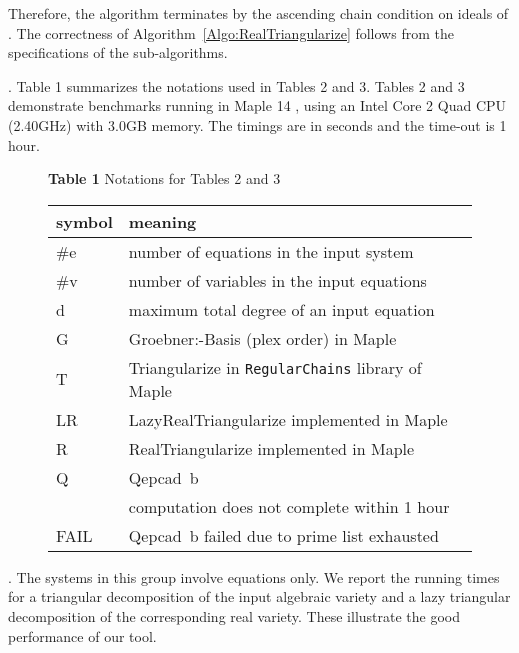 \documentclass{sig-alternate}
\newcommand{\RegularChains}{{\tt RegularChains}}
\begin{document}
Therefore, the algorithm terminates 
by the ascending chain condition on ideals of .
The correctness of Algorithm~\ref{Algo:RealTriangularize}
follows from the specifications of the 
sub-algorithms.




\smallskip{}.
Table 1 summarizes the notations used in Tables 2 and 3. Tables 2 and 3
demonstrate benchmarks running in {\sc Maple} 14 , 
using an Intel Core 2 Quad {\small CPU} (2.40{\small GHz}) 
with 3.0{\small GB} memory.
The timings are in seconds and 
the time-out is 1 hour.

\begin{figure}
\centering
{\textbf{Table 1} Notations for Tables 2 and 3}
\medskip
\newline
{\small
\begin{tabular}{l|l}
\hline
symbol & meaning\\\hline
\#e  & number of equations in the input system\\
\#v & number of variables in the input equations\\
d & maximum total degree of an input equation\\
G & {\sf Groebner:-Basis} ({\sf plex} order) in {\sc Maple}\\
T & {\sf Triangularize} in {\RegularChains} library of {\sc Maple}\\
LR & {\sf LazyRealTriangularize} implemented in {\sc Maple}\\
R &{\sf RealTriangularize} implemented in {\sc Maple}\\
Q & {\sc Qepcad~b}\\
 & computation does not complete within 1 hour\\
FAIL & {\sc Qepcad~b} failed due to prime list exhausted\\\hline
\end{tabular}
}
\end{figure}

\smallskip{}.
The systems in this group  involve equations only.
We report the running times for a 
triangular decomposition of the input algebraic variety
and a lazy triangular decomposition of the corresponding real variety.
These illustrate the good performance of 
our tool.
\end{document}
